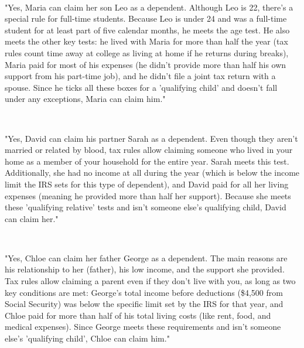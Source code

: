 \documentclass[11pt, letterpaper]{article}
\begin{document}
\begin{description}[style=unboxed, leftmargin=0pt]
    \item[For Scenario D1 (Leo - Dependent)] \mbox{} \\ \begin{RaggedRight}
    "Yes, Maria can claim her son Leo as a dependent. Although Leo is 22, there's a special rule for full-time students. Because Leo is under 24 and was a full-time student for at least part of five calendar months, he meets the age test. He also meets the other key tests: he lived with Maria for more than half the year (tax rules count time away at college as living at home if he returns during breaks), Maria paid for most of his expenses (he didn't provide more than half his own support from his part-time job), and he didn't file a joint tax return with a spouse. Since he ticks all these boxes for a 'qualifying child' and doesn't fall under any exceptions, Maria can claim him."
    \end{RaggedRight}

    \item[For Scenario D2 (Sarah - Dependent)] \mbox{} \\ \begin{RaggedRight}
    "Yes, David can claim his partner Sarah as a dependent. Even though they aren't married or related by blood, tax rules allow claiming someone who lived in your home as a member of your household for the entire year. Sarah meets this test. Additionally, she had no income at all during the year (which is below the income limit the IRS sets for this type of dependent), and David paid for all her living expenses (meaning he provided more than half her support). Because she meets these 'qualifying relative' tests and isn't someone else's qualifying child, David can claim her."
    \end{RaggedRight}

    \item[For Scenario D3 (George - Dependent)] \mbox{} \\ \begin{RaggedRight}
    "Yes, Chloe can claim her father George as a dependent. The main reasons are his relationship to her (father), his low income, and the support she provided. Tax rules allow claiming a parent even if they don't live with you, as long as two key conditions are met: George's total income before deductions (\$4,500 from Social Security) was below the specific limit set by the IRS for that year, and Chloe paid for more than half of his total living costs (like rent, food, and medical expenses). Since George meets these requirements and isn't someone else's 'qualifying child', Chloe can claim him."
    \end{RaggedRight}


\end{description}
\end{document}
